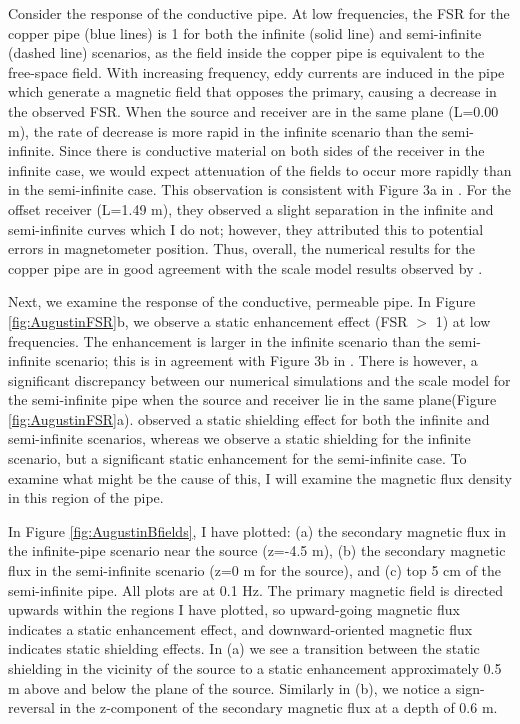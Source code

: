 Consider the response of the conductive pipe. At low frequencies, the FSR for the copper pipe (blue lines) is 1 for both the infinite (solid line) and semi-infinite (dashed line) scenarios, as the field inside the copper pipe is equivalent to the free-space field. With increasing frequency, eddy currents are induced in the pipe which generate a magnetic field that opposes the primary, causing a decrease in the observed FSR. When the source and receiver are in the same plane (L=0.00 m), the rate of decrease is more rapid in the infinite scenario than the semi-infinite. Since there is conductive material on both sides of the receiver in the infinite case, we would expect attenuation of the fields to occur more rapidly than in the semi-infinite case. This observation is consistent with Figure 3a in \cite{Augustin1989}. For the offset receiver (L=1.49 m), they observed a slight separation in the infinite and semi-infinite curves which I do not; however, they attributed this to potential errors in magnetometer position. Thus, overall, the numerical results for the copper pipe are in good agreement with the scale model results observed by \cite{Augustin1989}.

Next, we examine the response of the conductive, permeable pipe. In Figure \ref{fig:AugustinFSR}b, we observe a static enhancement effect (FSR $>$ 1) at low frequencies. The enhancement is larger in the infinite scenario than the semi-infinite scenario; this is in agreement with Figure 3b in \cite{Augustin1989}. There is however, a significant discrepancy between our numerical simulations and the scale model for the semi-infinite pipe when the source and receiver lie in the same plane(Figure \ref{fig:AugustinFSR}a). \cite{Augustin1989} observed a static shielding effect for both the infinite and semi-infinite scenarios, whereas we observe a static shielding for the infinite scenario, but a significant static enhancement for the semi-infinite case. To examine what might be the cause of this, I will examine the magnetic flux density in this region of the pipe.

In Figure \ref{fig:AugustinBfields}, I have plotted: (a) the secondary magnetic flux in the infinite-pipe scenario near the source (z=-4.5 m), (b) the secondary magnetic flux in the semi-infinite scenario (z=0 m for the source), and (c) top 5 cm of the semi-infinite pipe. All plots are at 0.1 Hz. The primary magnetic field is directed upwards within the regions I have plotted, so upward-going magnetic flux indicates a static enhancement effect, and downward-oriented magnetic flux indicates static shielding effects. In (a) we see a transition between the static shielding in the vicinity of the source to a static enhancement approximately 0.5 m above and below the plane of the source. Similarly in (b), we notice a sign-reversal in the z-component of the secondary magnetic flux at a depth of 0.6 m.


